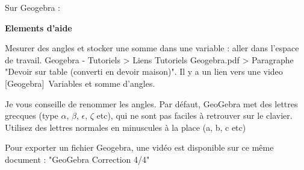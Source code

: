 \documentclass[answers]{exam}
\begin{document}
\begin{questions}

\question Sur Geogebra : 
\end{questions}

\begin{Indication}
  \textbf{Elements d'aide}
  \begin{compactitem}
    \item Mesurer des angles et stocker une somme dans une variable : aller dans l'espace de travail. Geogebra - Tutoriels > Liens Tutoriels Geogebra.pdf > Paragraphe "Devoir sur table (converti en devoir maison)". Il y a un lien vers une video [Geogebra] Variables et somme d'angles.
    \item Je vous conseille de renommer les angles. Par défaut, GeoGebra met des lettres grecques (type $\alpha$, $\beta$, $\epsilon$, $\zeta$ etc), qui ne sont pas faciles à retrouver sur le clavier. Utilisez des lettres normales en minuscules à la place (a, b, c etc)
    \item Pour exporter un fichier Geogebra, une vidéo est disponible sur ce même document : "GeoGebra Correction 4/4"
  \end{compactitem}
\end{Indication}
\end{document}
